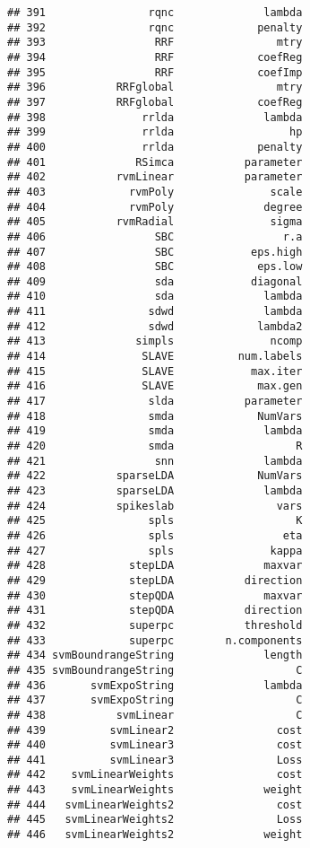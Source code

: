 \documentclass[
]{article}
\begin{document}
\begin{verbatim}
## 391                rqnc              lambda
## 392                rqnc             penalty
## 393                 RRF                mtry
## 394                 RRF             coefReg
## 395                 RRF             coefImp
## 396           RRFglobal                mtry
## 397           RRFglobal             coefReg
## 398               rrlda              lambda
## 399               rrlda                  hp
## 400               rrlda             penalty
## 401              RSimca           parameter
## 402           rvmLinear           parameter
## 403             rvmPoly               scale
## 404             rvmPoly              degree
## 405           rvmRadial               sigma
## 406                 SBC                 r.a
## 407                 SBC            eps.high
## 408                 SBC             eps.low
## 409                 sda            diagonal
## 410                 sda              lambda
## 411                sdwd              lambda
## 412                sdwd             lambda2
## 413              simpls               ncomp
## 414               SLAVE          num.labels
## 415               SLAVE            max.iter
## 416               SLAVE             max.gen
## 417                slda           parameter
## 418                smda             NumVars
## 419                smda              lambda
## 420                smda                   R
## 421                 snn              lambda
## 422           sparseLDA             NumVars
## 423           sparseLDA              lambda
## 424           spikeslab                vars
## 425                spls                   K
## 426                spls                 eta
## 427                spls               kappa
## 428             stepLDA              maxvar
## 429             stepLDA           direction
## 430             stepQDA              maxvar
## 431             stepQDA           direction
## 432             superpc           threshold
## 433             superpc        n.components
## 434 svmBoundrangeString              length
## 435 svmBoundrangeString                   C
## 436       svmExpoString              lambda
## 437       svmExpoString                   C
## 438           svmLinear                   C
## 439          svmLinear2                cost
## 440          svmLinear3                cost
## 441          svmLinear3                Loss
## 442    svmLinearWeights                cost
## 443    svmLinearWeights              weight
## 444   svmLinearWeights2                cost
## 445   svmLinearWeights2                Loss
## 446   svmLinearWeights2              weight

\end{verbatim}
\end{document}
